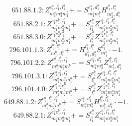 \documentclass[letterpaper,10pt,fleqn,leqno,onecolumn]{article}
\begin{document}
\begin{equation} \;\;\;\;\;\;  651.88.1.2: Z^{e_{1}^{a},l_{1}^{b},l_{1}^{a}}_{m_{1}^{a}m_{2}^{a}m_{1}^{b}}+=S^{e_{1}^{a},d_{1}^{b}}_{m_{1}^{a}m_{1}^{b}}H^{l_{1}^{b},l_{1}^{a}}_{m_{2}^{a},d_{1}^{b}} \end{equation}
\begin{equation} \;\;\;\;\;\;  651.88.2.1: Z^{e_{1}^{a}e_{1}^{b},l_{1}^{a}}_{m_{1}^{a}m_{2}^{a}m_{1}^{b}}+=S^{e_{1}^{b}}_{l_{1}^{b}}Z^{e_{1}^{a},l_{1}^{b},l_{1}^{a}}_{m_{1}^{a}m_{2}^{a}m_{1}^{b}} \end{equation}
\begin{equation} \;\;\;\;\;\;  651.88.3.0: Z^{e_{1}^{a}e_{2}^{a}e_{1}^{b}}_{m_{1}^{a}m_{2}^{a}m_{1}^{b}}+=S^{e_{1}^{a}}_{l_{1}^{a}}Z^{e_{2}^{a}e_{1}^{b},l_{1}^{a}}_{m_{1}^{a}m_{2}^{a}m_{1}^{b}} \end{equation}
\begin{equation} \;\;\;\;\;\;  796.101.1.3: Z^{l_{1}^{b},l_{1}^{a}}_{m_{1}^{b},d_{1}^{a}}+=H^{l_{1}^{b},l_{1}^{a}}_{d_{1}^{b},d_{1}^{a}}S^{d_{1}^{b}}_{m_{1}^{b}}\cdot -1. \end{equation}
\begin{equation} \;\;\;\;\;\;  796.101.2.2: Z^{e_{1}^{a},l_{1}^{b},l_{1}^{a}}_{m_{1}^{a}m_{2}^{a}m_{1}^{b}}+=S^{e_{1}^{a},d_{1}^{a}}_{m_{1}^{a}m_{2}^{a}}Z^{l_{1}^{b},l_{1}^{a}}_{m_{1}^{b},d_{1}^{a}} \end{equation}
\begin{equation} \;\;\;\;\;\;  796.101.3.1: Z^{e_{1}^{a}e_{1}^{b},l_{1}^{a}}_{m_{1}^{a}m_{2}^{a}m_{1}^{b}}+=S^{e_{1}^{b}}_{l_{1}^{b}}Z^{e_{1}^{a},l_{1}^{b},l_{1}^{a}}_{m_{1}^{a}m_{2}^{a}m_{1}^{b}} \end{equation}
\begin{equation} \;\;\;\;\;\;  796.101.4.0: Z^{e_{1}^{a}e_{2}^{a}e_{1}^{b}}_{m_{1}^{a}m_{2}^{a}m_{1}^{b}}+=S^{e_{1}^{a}}_{l_{1}^{a}}Z^{e_{2}^{a}e_{1}^{b},l_{1}^{a}}_{m_{1}^{a}m_{2}^{a}m_{1}^{b}} \end{equation}
\begin{equation} \;\;\;\;\;\;  649.88.1.2: Z^{e_{1}^{a},l_{1}^{b},l_{1}^{a}}_{m_{1}^{a}m_{2}^{a}m_{1}^{b}}+=S^{e_{1}^{a},d_{1}^{a}}_{m_{1}^{a}m_{2}^{a}}H^{l_{1}^{b},l_{1}^{a}}_{m_{1}^{b},d_{1}^{a}}\cdot -1. \end{equation}
\begin{equation} \;\;\;\;\;\;  649.88.2.1: Z^{e_{1}^{a}e_{1}^{b},l_{1}^{a}}_{m_{1}^{a}m_{2}^{a}m_{1}^{b}}+=S^{e_{1}^{b}}_{l_{1}^{b}}Z^{e_{1}^{a},l_{1}^{b},l_{1}^{a}}_{m_{1}^{a}m_{2}^{a}m_{1}^{b}} \end{equation}
\end{document}
